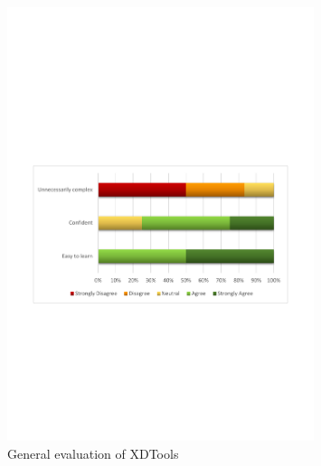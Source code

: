 \begin{figure}[H]
  \centering
    \includegraphics[width=0.8\textwidth]{images/charts/tool_general.pdf}
	\caption[General Evaluation]{General evaluation of XDTools}
	\label{fig:tool_general}
\end{figure}

